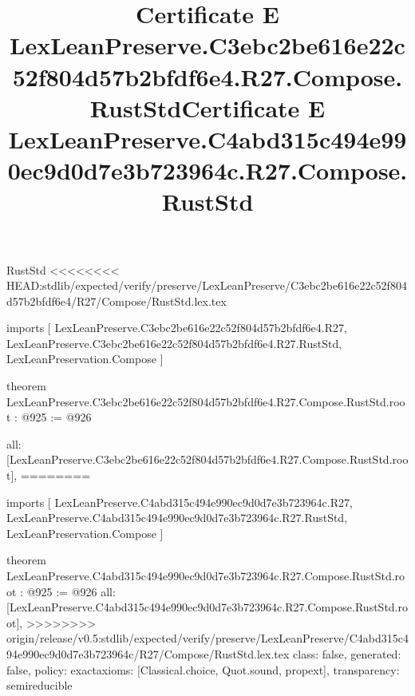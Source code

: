 \begin{lexlean}{RustStd}
<<<<<<<< HEAD:stdlib/expected/verify/preserve/LexLeanPreserve/C3ebc2be616e22c52f804d57b2bfdf6e4/R27/Compose/RustStd.lex.tex
\title{Certificate E LexLeanPreserve.C3ebc2be616e22c52f804d57b2bfdf6e4.R27.Compose.RustStd}
\begin{coremodule}
imports [
  LexLeanPreserve.C3ebc2be616e22c52f804d57b2bfdf6e4.R27,
  LexLeanPreserve.C3ebc2be616e22c52f804d57b2bfdf6e4.R27.RustStd,
  LexLeanPreservation.Compose
]

theorem LexLeanPreserve.C3ebc2be616e22c52f804d57b2bfdf6e4.R27.Compose.RustStd.root : @925 := @926 {
  all: [LexLeanPreserve.C3ebc2be616e22c52f804d57b2bfdf6e4.R27.Compose.RustStd.root],
========
\title{Certificate E LexLeanPreserve.C4abd315c494e990ec9d0d7e3b723964c.R27.Compose.RustStd}
\begin{coremodule}
imports [
  LexLeanPreserve.C4abd315c494e990ec9d0d7e3b723964c.R27,
  LexLeanPreserve.C4abd315c494e990ec9d0d7e3b723964c.R27.RustStd,
  LexLeanPreservation.Compose
]

theorem LexLeanPreserve.C4abd315c494e990ec9d0d7e3b723964c.R27.Compose.RustStd.root : @925 := @926 {
  all: [LexLeanPreserve.C4abd315c494e990ec9d0d7e3b723964c.R27.Compose.RustStd.root],
>>>>>>>> origin/release/v0.5:stdlib/expected/verify/preserve/LexLeanPreserve/C4abd315c494e990ec9d0d7e3b723964c/R27/Compose/RustStd.lex.tex
  class: false,
  generated: false,
  policy: exact{axioms: [Classical.choice, Quot.sound, propext]},
  transparency: semireducible
}


\end{coremodule}}
\end{coremodule}
\end{lexlean}

